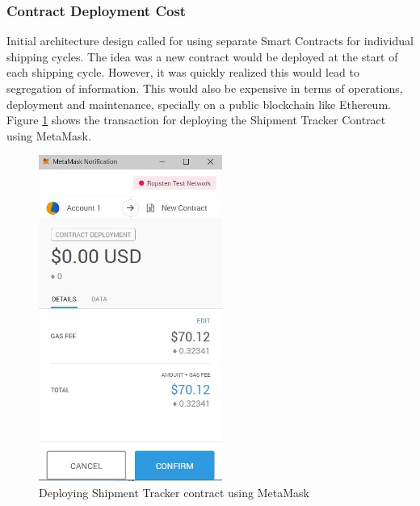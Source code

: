 \subsubsection{Contract Deployment Cost}
Initial architecture design called for using separate Smart Contracts for individual shipping cycles. The idea was a new contract would be deployed at the start of each shipping cycle. However, it was quickly realized this would lead to segregation of information. This would also be expensive in terms of operations, deployment and maintenance, specially on a public blockchain like Ethereum. Figure \ref{fig:STC} shows the transaction for deploying the Shipment Tracker Contract using MetaMask. 
\clearpage
\begin{figure}[!h]
	\centering
    \includegraphics[width=60mm,scale=0.5]{figs/STC}
	\caption{Deploying Shipment Tracker contract using MetaMask}
	\label{fig:STC} 
\end{figure} 

